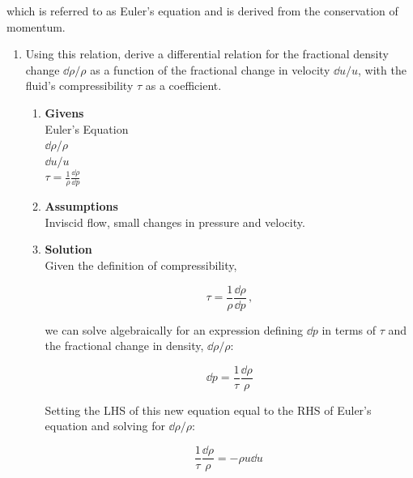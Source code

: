 \documentclass[12pt,letterpaper]{article}
\begin{document}
	which is referred to as Euler’s equation and is derived from the conservation of momentum.
	
	\begin{enumerate}[label=(\alph*)]
		\label{Sec:Problem1}
		\item Using this relation, derive a differential relation for the fractional density change $\dd \rho / \rho$ as a function of the fractional change in velocity $\dd u/ u$, with the fluid's compressibility $\tau$ as a coefficient.
		
		\medskip
		
		\begin{enumerate}[label=\arabic*.]
			
			\item{\textbf{Givens}} \\
				Euler's Equation\\
				$\dd \rho / \rho $ \\
				$\dd u / u$ \\
				$\tau = \frac{1}{\rho} \frac{\dd \rho}{\dd p}$

			\item{\textbf{Assumptions}} \\
			Inviscid flow, small changes in pressure and velocity.\\
			
			
			\item{\textbf{Solution}} \\
				Given the definition of compressibility,
			
			
			\begin{equation*}
				\tau = \frac{1}{\rho} \frac{\dd \rho}{\dd p} \,,
			\end{equation*}
			
			we can solve algebraically for an expression defining $\dd p$ in terms of $\tau$ and the fractional change in density, $\dd \rho / \rho$:
			
			\begin{equation*}
				\dd p = \frac{1}{\tau} \frac{\dd \rho}{\rho}
			\end{equation*}
		
			Setting the LHS of this new equation equal to the RHS of Euler's equation and solving for $\dd \rho / \rho$:
			
			\begin{equation*}
				\frac{1}{\tau} \frac{\dd \rho}{\rho} = - \rho u\dd u\
			\end{equation*}
			

\end{enumerate}
\end{enumerate}
\end{document}
